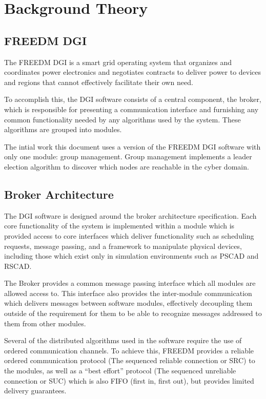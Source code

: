 \section{Background Theory}
\subsection{FREEDM DGI}
The FREEDM DGI is a smart grid operating system that organizes and coordinates 
power electronics and negotiates contracts to deliver power to devices and 
regions that cannot effectively facilitate their own need.

To accomplish this, the DGI software consists of a central component, the 
broker, which is responsible for presenting a communication interface and 
furnishing any common functionality needed by any algorithms used by the 
system. These algorithms are grouped into modules.

The intial work this document uses a version of the FREEDM DGI software with 
only one module: group management. Group management implements a leader
election algorithm to discover which nodes are reachable in the cyber domain.

\subsection{Broker Architecture}

The DGI software is designed around the broker architecture specification. Each 
core functionality of the system is implemented within a module 
which is provided access to core interfaces which deliver functionality such as 
scheduling requests, message passing, and a framework to manipulate physical 
devices, including those which exist only in simulation environments such as 
PSCAD\cite{PSCAD} and RSCAD\cite{RSCAD}.

The Broker provides a common message passing interface which all modules are 
allowed access to. This interface also provides the inter-module communication 
which delivers messages between software modules, effectively decoupling them 
outside of the requirement for them to be able to recognize messages addressed 
to them from other modules.

Several of the distributed algorithms used in the software require the use of 
ordered communication channels. To achieve this, FREEDM provides a reliable 
ordered communication protocol (The sequenced reliable connection or SRC) to 
the modules, as well as a ``best effort'' protocol (The sequenced unreliable 
connection or SUC) which is also FIFO (first in, first out), but provides 
limited delivery guarantees.

